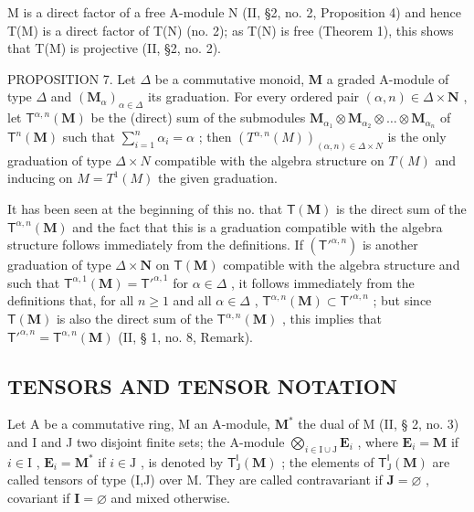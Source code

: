 M is a direct factor of a free A-module N (II, §2, no. 2, Proposition 4) and hence T(M) is a direct factor of T(N) (no. 2); as T(N) is free (Theorem 1), this shows that T(M) is projective (II, §2, no. 2).

PROPOSITION 7. Let \(\Delta\) be a commutative monoid, \(\mathbf{M}\) a graded A-module of type \(\Delta\) and \((\mathbf{M}_{\alpha})_{\alpha \in \Delta}\) its graduation. For every ordered pair \((\alpha, n) \in \Delta \times \mathbf{N}\) , let \(\mathsf{T}^{\alpha,n}(\mathbf{M})\) be the (direct) sum of the submodules \(\mathbf{M}_{\alpha_1} \otimes \mathbf{M}_{\alpha_2} \otimes \dots \otimes \mathbf{M}_{\alpha_n}\) of \(\mathsf{T}^n(\mathbf{M})\) such that \(\sum_{i=1}^{n} \alpha_i = \alpha\) ; then \((T^{\alpha, n}(M))_{(\alpha, n) \in \Delta \times N}\) is the only graduation of type \(\Delta \times N\) compatible with the algebra structure on \(T(M)\) and inducing on \(M = T^1(M)\) the given graduation.

It has been seen at the beginning of this no. that \(\mathsf{T}(\mathbf{M})\) is the direct sum of the \(\mathsf{T}^{\alpha,n}(\mathbf{M})\) and the fact that this is a graduation compatible with the algebra structure follows immediately from the definitions. If \((\mathsf{T}'^{\alpha,n})\) is another graduation of type \(\Delta \times \mathbf{N}\) on \(\mathsf{T}(\mathbf{M})\) compatible with the algebra structure and such that \(\mathsf{T}^{\alpha,1}(\mathbf{M}) = \mathsf{T}'^{\alpha,1}\) for \(\alpha \in \Delta\) , it follows immediately from the definitions that, for all \(n \geqslant 1\) and all \(\alpha \in \Delta\) , \(\mathsf{T}^{\alpha,n}(\mathbf{M}) \subset \mathsf{T}'^{\alpha,n}\) ; but since \(\mathsf{T}(\mathbf{M})\) is also the direct sum of the \(\mathsf{T}^{\alpha,n}(\mathbf{M})\) , this implies that \(\mathsf{T}'^{\alpha,n} = \mathsf{T}^{\alpha,n}(\mathbf{M})\) (II, § 1, no. 8, Remark).

\subsection{TENSORS AND TENSOR NOTATION}

Let A be a commutative ring, M an A-module, \(\mathbf{M}^*\) the dual of M (II, § 2, no. 3) and I and J two disjoint finite sets; the A-module \(\bigotimes_{i\in \mathrm{I}\cup \mathrm{J}}\mathbf{E}_i\) , where \(\mathbf{E}_i = \mathbf{M}\) if \(i\in \mathrm{I}\) , \(\mathbf{E}_i = \mathbf{M}^*\) if \(i\in \mathrm{J}\) , is denoted by \(\mathsf{T}_{\mathsf{J}}^{\mathsf{I}}(\mathbf{M})\) ; the elements of \(\mathsf{T}_{\mathsf{J}}^{\mathsf{I}}(\mathbf{M})\) are called tensors of type (I,J) over M. They are called contravariant if \(\mathbf{J} = \varnothing\) , covariant if \(\mathbf{I} = \varnothing\) and mixed otherwise.

